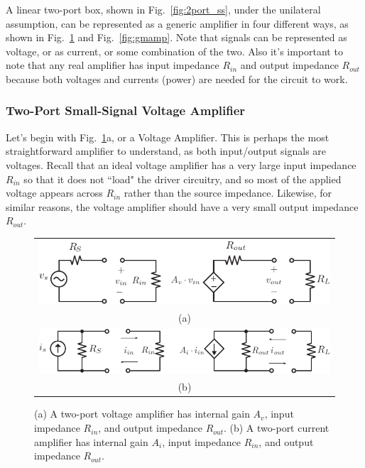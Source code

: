 A linear two-port box, shown in Fig.~\ref{fig:2port_ss}, under the unilateral assumption, can be represented as a generic amplifier in four different ways, as shown in Fig.~\ref{fig:vi_amp} and Fig.~\ref{fig:gmamp}.  Note that signals can be represented as voltage, or as current, or some combination of the two.  Also it's important to note that any real amplifier has input impedance $R_{in}$ and output impedance $R_{out}$ because both voltages and currents (power) are needed for the circuit to work.  
\subsubsection{Two-Port Small-Signal Voltage Amplifier}
Let's begin with Fig.~\ref{fig:vi_amp}a, or a Voltage Amplifier.  This is perhaps the most straightforward amplifier to understand, as both input/output signals are voltages.  Recall that an ideal voltage amplifier has a very large input impedance $R_{in}$ so that it does not ``load" the driver circuitry, and so most of the applied voltage appears across $R_{in}$ rather than the source impedance.  Likewise, for similar reasons, the voltage amplifier should have a very small output impedance $R_{out}$.
\begin{figure}[tb]
\begin{center}
\begin{tabular}{c}
\includegraphics[width=.7\columnwidth]{vamp_label} \\
(a) \\
\includegraphics[width=.7\columnwidth]{iamp} \\
(b) \\
\end{tabular}
\end{center}
\caption{(a) A two-port voltage amplifier has internal gain $A_v$, input impedance $R_{in}$, and output impedance $R_{out}$.  (b) A two-port current amplifier has internal gain $A_i$, input impedance $R_{in}$, and output impedance $R_{out}$.}
\label{fig:vi_amp}
\end{figure}
